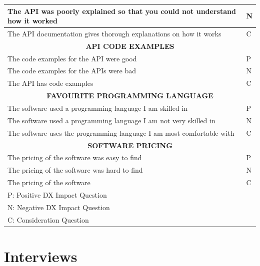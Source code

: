 \documentclass{cslthse-msc}
\begin{document}
\begin{table}[H]
\begin{tabularx}{\columnwidth}{X|l}
        The API was poorly explained so that you could not understand how it worked	&	N		\\ \hline
        The API documentation gives thorough explanations on how it works	&	C		\\ \hline \hline
        \multicolumn{2}{c}{\textbf{	API CODE EXAMPLES	}} \\ \hline
        The code examples for the API were good	&	P		\\ \hline
        The code examples for the APIs were bad	&	N		\\ \hline
        The API has code examples	&	C		\\ \hline \hline
        \multicolumn{2}{c}{\textbf{	FAVOURITE PROGRAMMING LANGUAGE	}} \\ \hline
        The software used a programming language I am skilled in	&	P		\\ \hline
        The software used a programming language I am not very skilled in	&	N		\\ \hline
        The software uses the programming language I am most comfortable with	&	C		\\ \hline \hline
        \multicolumn{2}{c}{\textbf{	SOFTWARE PRICING	}} \\ \hline
        The pricing of the software was easy to find	&	P		\\ \hline
        The pricing of the software was hard to find	&	N		\\ \hline
        The pricing of the software	&	C		\\ \hline \hline
        \multicolumn{2}{l}{P: Positive DX Impact Question} \\
        \multicolumn{2}{l}{N: Negative DX Impact Question} \\
        \multicolumn{2}{l}{C: Consideration Question}

        \end{tabularx}
    \end{table}

    \section{Interviews}
\end{document}
